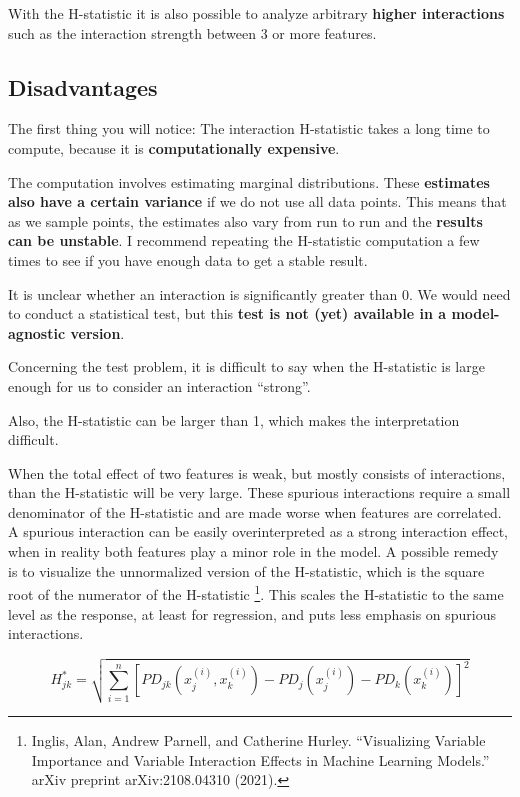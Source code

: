 \documentclass[
  10pt,
]{scrbook}
\begin{document}
With the H-statistic it is also possible to analyze arbitrary \textbf{higher interactions} such as the interaction strength between 3 or more features.

\hypertarget{disadvantages-7}{%
\subsection{Disadvantages}\label{disadvantages-7}}

The first thing you will notice:
The interaction H-statistic takes a long time to compute, because it is \textbf{computationally expensive}.

The computation involves estimating marginal distributions.
These \textbf{estimates also have a certain variance} if we do not use all data points.
This means that as we sample points, the estimates also vary from run to run and the \textbf{results can be unstable}.
I recommend repeating the H-statistic computation a few times to see if you have enough data to get a stable result.

It is unclear whether an interaction is significantly greater than 0.
We would need to conduct a statistical test, but this \textbf{test is not (yet) available in a model-agnostic version}.

Concerning the test problem, it is difficult to say when the H-statistic is large enough for us to consider an interaction ``strong''.

Also, the H-statistic can be larger than 1, which makes the interpretation difficult.

When the total effect of two features is weak, but mostly consists of interactions, than the H-statistic will be very large.
These spurious interactions require a small denominator of the H-statistic and are made worse when features are correlated.
A spurious interaction can be easily overinterpreted as a strong interaction effect, when in reality both features play a minor role in the model.
A possible remedy is to visualize the unnormalized version of the H-statistic, which is the square root of the numerator of the H-statistic \footnote{Inglis, Alan, Andrew Parnell, and Catherine Hurley. ``Visualizing Variable Importance and Variable Interaction Effects in Machine Learning Models.'' arXiv preprint arXiv:2108.04310 (2021).}.
This scales the H-statistic to the same level as the response, at least for regression, and puts less emphasis on spurious interactions.

\[H^{*}_{jk} = \sqrt{\sum_{i=1}^n\left[PD_{jk}(x_{j}^{(i)},x_k^{(i)})-PD_j(x_j^{(i)}) - PD_k(x_{k}^{(i)})\right]^2}\]
\end{document}
